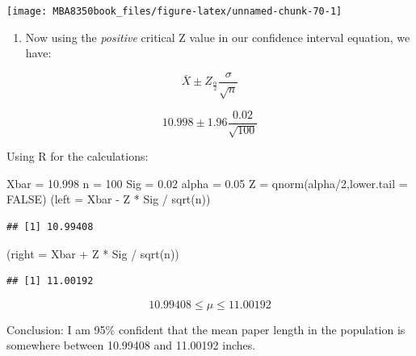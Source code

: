 \documentclass[
]{book}
\newenvironment{Shaded}{\begin{snugshade}}{\end{snugshade}}
\newcommand{\AttributeTok}[1]{\textcolor[rgb]{0.77,0.63,0.00}{#1}}
\newcommand{\ConstantTok}[1]{\textcolor[rgb]{0.00,0.00,0.00}{#1}}
\newcommand{\DecValTok}[1]{\textcolor[rgb]{0.00,0.00,0.81}{#1}}
\newcommand{\FloatTok}[1]{\textcolor[rgb]{0.00,0.00,0.81}{#1}}
\newcommand{\FunctionTok}[1]{\textcolor[rgb]{0.00,0.00,0.00}{#1}}
\newcommand{\NormalTok}[1]{#1}
\newcommand{\OtherTok}[1]{\textcolor[rgb]{0.56,0.35,0.01}{#1}}
\newcommand{\SpecialCharTok}[1]{\textcolor[rgb]{0.00,0.00,0.00}{#1}}
\providecommand{\tightlist}{%
  \setlength{\itemsep}{0pt}\setlength{\parskip}{0pt}}
\begin{document}
\begin{center}\texttt{[image: MBA8350book\_files/figure-latex/unnamed-chunk-70-1]} \end{center}

\begin{enumerate}
\def\labelenumi{\arabic{enumi}.}
\setcounter{enumi}{1}
\tightlist
\item
  Now using the \emph{positive} critical Z value in our confidence interval equation, we have:
\end{enumerate}

\[\bar{X} \pm Z_{\frac{\alpha}{2}}\frac{\sigma}{\sqrt{n}}\]

\[10.998 \pm 1.96\frac{0.02}{\sqrt{100}}\]

Using R for the calculations:

\begin{Shaded}
\begin{Highlighting}[]
\NormalTok{Xbar }\OtherTok{=} \FloatTok{10.998}
\NormalTok{n }\OtherTok{=} \DecValTok{100}
\NormalTok{Sig }\OtherTok{=} \FloatTok{0.02}
\NormalTok{alpha }\OtherTok{=} \FloatTok{0.05}
\NormalTok{Z }\OtherTok{=} \FunctionTok{qnorm}\NormalTok{(alpha}\SpecialCharTok{/}\DecValTok{2}\NormalTok{,}\AttributeTok{lower.tail =} \ConstantTok{FALSE}\NormalTok{)}
\NormalTok{(}\AttributeTok{left =}\NormalTok{ Xbar }\SpecialCharTok{{-}}\NormalTok{ Z }\SpecialCharTok{*}\NormalTok{ Sig }\SpecialCharTok{/} \FunctionTok{sqrt}\NormalTok{(n))}
\end{Highlighting}
\end{Shaded}

\begin{verbatim}
## [1] 10.99408
\end{verbatim}

\begin{Shaded}
\begin{Highlighting}[]
\NormalTok{(}\AttributeTok{right =}\NormalTok{ Xbar }\SpecialCharTok{+}\NormalTok{ Z }\SpecialCharTok{*}\NormalTok{ Sig }\SpecialCharTok{/} \FunctionTok{sqrt}\NormalTok{(n))}
\end{Highlighting}
\end{Shaded}

\begin{verbatim}
## [1] 11.00192
\end{verbatim}

\[ 10.99408 \leq \mu \leq 11.00192 \]

Conclusion: I am 95\% confident that the mean paper length in the population is somewhere between 10.99408 and 11.00192 inches.
\end{document}
